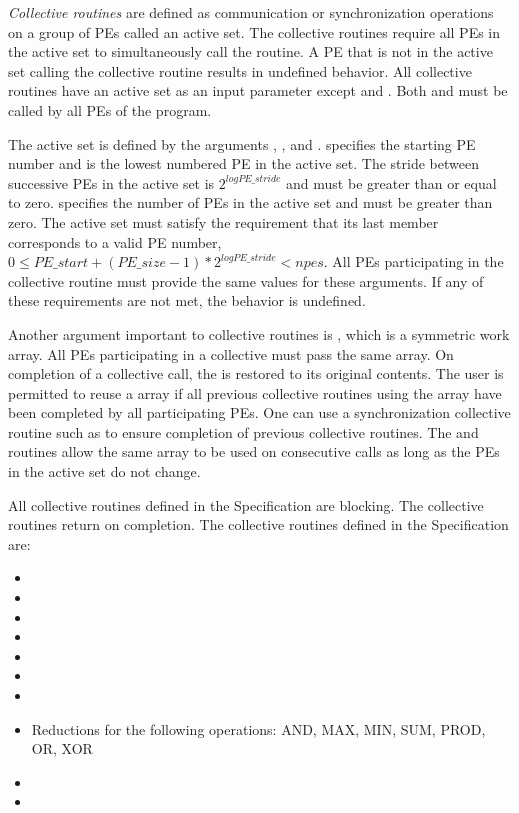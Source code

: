 \emph{Collective routines} are defined as communication or synchronization
operations on a group of \acp{PE} called an active set. The collective
routines require all \acp{PE} in the active set to simultaneously call the
routine.  A \ac{PE} that is not in the active set calling the collective
routine results in undefined behavior.  All collective routines have an
active set as an input parameter except  and
. Both  and
 must be called by all \acp{PE} of the \openshmem program.

The active set is defined by the arguments , ,
and .   specifies the starting \ac{PE} number and
is the lowest numbered PE in the active set.  The stride between successive
\acp{PE} in the active set is $2^{logPE\_stride}$ and  must
be greater than or equal to zero.   specifies the number of
\acp{PE} in the active set and must be greater than zero.  The active set must
satisfy the requirement that its last member corresponds to a valid \ac{PE}
number,
$0 \le PE\_start + (PE\_size - 1) * 2^{logPE\_stride} < npes$.
All \acp{PE} participating in the collective routine must provide the same
values for these arguments.  If any of these requirements are not met, the
behavior is undefined.

Another argument important to collective routines is , which is a
symmetric work array.  All \acp{PE} participating in a collective must pass the
same  array.  On completion of a collective call, the  is
restored to its original contents.  The user is permitted to reuse a 
array if all previous collective routines using the  array have been
completed by all participating \acp{PE}.  One can use a synchronization
collective routine such as  to ensure completion of previous collective
routines. The  and  routines allow the same
 array to be used on consecutive calls as long as the \acp{PE}
in the active set do not change.

All collective routines defined in the Specification are blocking.  The
collective routines return on completion.  The collective routines defined in
the \openshmem Specification are:

\begin{itemize}
\item {}
\item {}
\item {}
\item {}
\item {}
\item {}
\item {}
\item Reductions for the following operations: AND, MAX, MIN, SUM, PROD, OR, XOR
\item {}
\item {}
\end{itemize}
